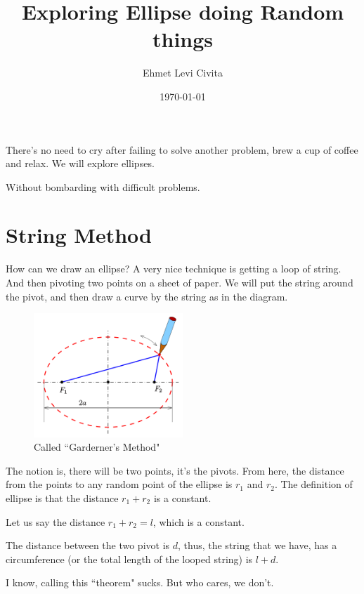 \documentclass[11pt,a4paper]{article}
\title{Exploring Ellipse doing Random things}
\author{Ehmet Levi Civita}
\date{\today}
\begin{document}
\maketitle

There's no need to cry after failing to solve another problem, brew a cup of coffee and relax. We will explore ellipses.

Without bombarding with difficult problems. 
\section{ String Method }
How can we draw an ellipse? A very nice technique is getting a loop of string. And then pivoting two points on a sheet of paper. We will put the string around the pivot,
and then draw a curve by the string as in the diagram.
\begin{figure}[ht!]
    \centering
    \includegraphics[width=0.5\textwidth]{Elliko-g.svg.png}
    \caption{ Called ``Garderner's Method" }
    \label{fig:}
\end{figure}

The notion is, there will be two points, it's the pivots. From here, the distance from the points to any random point of the ellipse is $r_1$ and $r_2$. The definition of ellipse is that the distance $r_1 + r_2$ is a constant. 

Let us say the distance $r_1 + r_2 = l$, which is a constant. 

The distance between the two pivot is $d$, thus, the string that we have, has a circumference (or the total length of the looped string) is $l + d$. 


I know, calling this ``theorem" sucks. But who cares, we don't. 
\end{document}

